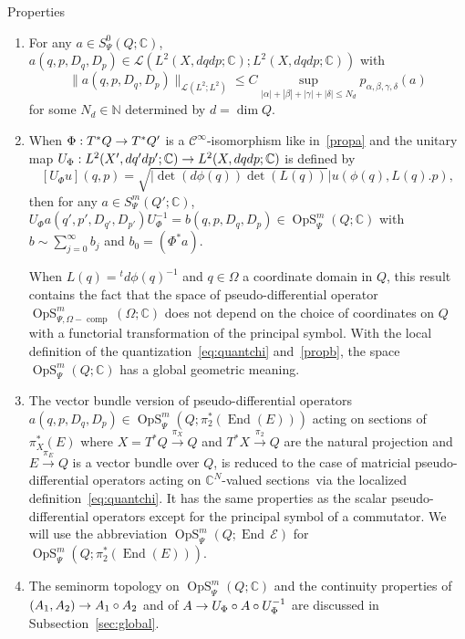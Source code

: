 \documentclass[10pt]{amsart}
\theoremstyle{definition}\newtheorem{defi}[theo]{Definition}\newtheorem{rema}[theo]{Remark}\newtheorem{exam}[theo]{Example}\newtheorem{exem}[theo]{Example}\newtheorem{nota}[theo]{Notation}
\newcommand{\C}{\mathbb{C}}
\newcommand{\N}{\mathbb{N}}
\newcommand{\clC}{\mathcal{C}}
\newcommand{\clE}{\mathcal{E}}
\newcommand{\clL}{\mathcal{L}}
\DeclareMathOperator{\End}{End}
\DeclareMathOperator{\OpS}{OpS}
\DeclareMathOperator{\ccomp}{comp}
\DeclareMathOperator{\Idd}{Id}
\renewcommand*{\to}{\mathchoice{\longrightarrow}{\rightarrow}{\rightarrow}{\rightarrow}}
\newenvironment{enonce*}[2][]{\par\smallskip\noindent\textbf{#2.}\ }{\par\smallskip}
\begin{document}
\begin{enonce*}[remark]{Properties}
\begin{enumerate}
In particular for any $a\in \OpS^{m}_{\Psi}(Q;\C)$ which is elliptic $(|a(q,p,\xi,\eta)|\geq C^{-1}(1+|\xi|^{2}+|p|^{4}+|\eta|^{4})^{m/2})$ there exists $b\sim \sum_{n=0}^{\infty}b_{j}$ with $b_{0}=\frac{1}{a_0}$ such that $b(q,p,D_{q},D_{p})\circ a(q,p,D_{q},D_{p})\sim a(q,p,D_{q},D_{p})\circ b(q,p,D_{q},D_{p})\sim\Idd$.
\item\label{propf} For any $a\in S^{0}_{\Psi}(Q;\C)$, $a(q,p,D_{q},D_{p})\in \clL(L^{2}(X,dqdp;\C); L^{2}(X,dqdp;\C))$ with
\[
\|a(q,p,D_{q},D_{p})\|_{\clL(L^{2};L^{2})}
\leq C\sup_{|\alpha|+|\beta|+|\gamma|+|\delta|\leq N_{d}}p_{\alpha,\beta,\gamma,\delta}(a)
\]
for some $N_{d}\in \N$ determined by $d=\dim Q$.
\item\label{propg} When $\Phi:T^{*}Q\to T^{*}Q'$ is a $\clC^{\infty}$-isomorphism like in~\eqref{propa} and the unitary map $U_{\Phi}:L^{2}(X',dq'dp';\C)\to L^{2}(X,dqdp;\C)$ is defined by
\[
[U_{\Phi}u](q,p)=\sqrt {\lvert\det(d\phi(q))\det(L(q))}|u(\phi(q),L(q).p),
\]
then for any $a\in S^{m}_{\Psi}(Q';\C)$, $U_{\Phi}a(q',p',D_{q'},D_{p'})U_{\Phi}^{-1}=b(q,p,D_{q},D_{p})\in \OpS^{m}_{\Psi}(Q;\C)$ with $b\sim\sum_{j=0}^{\infty}b_{j}$ and $b_{0}=(\Phi^{*}a)$.

When $L(q)={}^{t}d\phi(q)^{-1}$ and $q\in \Omega$ a coordinate domain in $Q$, this result contains the fact that the space of pseudo-differential operator $\OpS^{m}_{\Psi, \Omega-\ccomp}(\Omega;\C)$ does not depend on the choice of coordinates on $Q$ with a functorial transformation of the principal symbol. With the local definition of the quantization~\eqref{eq:quantchi} and~\eqref{propb}, the space $\OpS^{m}_{\Psi}(Q;\C)$ has a global geometric meaning.

\item\label{proph} The vector bundle version of pseudo-differential operators $a(q,p,D_{q},D_{p})\in \OpS^{m}_{\Psi}(Q;\pi_{2}^{*}(\End(E)))$ acting on sections of $\pi_{X}^{*}(E)$ where $X=T^{*}Q\xrightarrow{\pi_{X}} Q$ and $T^{*}X\xrightarrow{\pi_{2}} Q$ are the natural projection and $E\xrightarrow{\pi_{E}} Q$ is a vector bundle over $Q$, is reduced to the case of matricial pseudo-differential operators acting on $\C^{N}$-valued sections~via the localized definition~\eqref{eq:quantchi}. It has the same properties as the scalar pseudo-differential operators except for the principal symbol of a commutator. We will use the abbreviation $\OpS^{m}_{\Psi}(Q;\End\,\clE)$ for $\OpS^{m}_{\Psi}(Q;\pi_{2}^{*}(\End(E)))$.
\item\label{propi} The seminorm topology on $\OpS^{m}_{\Psi}(Q;\C)$ and the continuity properties of $(A_{1},A_{2})\to A_{1}\circ A_{2}$ and of $A\to U_{\Phi}\circ A \circ U_{\Phi}^{-1}$ are discussed in Subsection~\ref{sec:global}.
\end{enumerate}
\end{enonce*}
\end{document}
